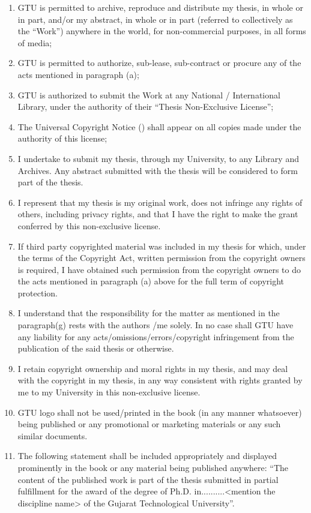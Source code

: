 \begin{enumerate} [label=\alph*.]
	\item GTU is permitted to archive, reproduce and distribute my thesis, in whole or in part, and/or my abstract, in whole or in part (referred to collectively as the “Work”) anywhere in the world, for non-commercial purposes, in all forms of media; 
	\item GTU is permitted to authorize, sub-lease, sub-contract or procure any of the acts mentioned in paragraph (a); 
	\item GTU is authorized to submit the Work at any National / International Library, under the authority of their “Thesis Non-Exclusive License”; 
	\item The Universal Copyright Notice (\textcopyright) shall appear on all copies made under the authority of this license;
	\item I undertake to submit my thesis, through my University, to any Library and Archives. Any abstract submitted with the thesis will be considered to form part of the thesis. 
	\item I represent that my thesis is my original work, does not infringe any rights of others, including privacy rights, and that I have the right to make the grant conferred by this non-exclusive license.
	\item If third party copyrighted material was included in my thesis for which, under the terms of the Copyright Act, written permission from the copyright owners is required, I have obtained such permission from the copyright owners to do the acts mentioned in paragraph (a) above for the full term of copyright protection.
	\item I understand that the responsibility for the matter as mentioned in the paragraph(g) rests with the authors /me solely. In no case shall GTU have any liability for any acts/omissions/errors/copyright infringement from the publication of the said thesis or otherwise.
	\item I retain copyright ownership and moral rights in my thesis, and may deal with the copyright in my thesis, in any way consistent with rights granted by me to my University in this non-exclusive license.
	\item GTU logo shall not be used/printed in the book (in any manner whatsoever) being published or any promotional or marketing materials or any such similar documents.
	\item The following statement shall be included appropriately and displayed prominently in the book or any material being published anywhere: “The content of the published work is part of the thesis submitted in partial fulfillment for the award of the degree of Ph.D. in..........<mention the discipline name> of the Gujarat Technological University”.

\end{enumerate}
